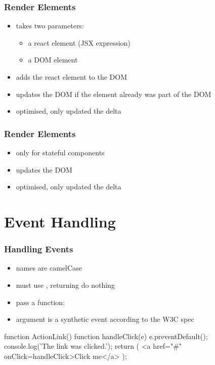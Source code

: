 \begin{frame}[fragile] \frametitle{Render Elements}
\begin{itemize}
  \item takes two parameters:
  \begin{itemize}
    \item a react element (JSX expression)
    \item a DOM element
  \end{itemize}
  \item adds the react element to the DOM
  \item updates the DOM if the element already was part of the DOM
  \item optimised, only updated the delta
\end{itemize}
\end{frame}

\begin{frame}[fragile] \frametitle{Render Elements}
\begin{itemize}
  \item only for stateful components
  \item updates the DOM
  \item optimised, only updated the delta
\end{itemize}
\end{frame}

\section{Event Handling}
\begin{frame}[fragile] \frametitle{Handling Events}
\begin{itemize}
  \item names are camelCase
  \item must use , returning  do nothing
  \item pass a function: 
  \item argument is a synthetic event according to the W3C spec
\end{itemize}
\begin{CodeBox}{}
function ActionLink() {
  function handleClick(e) {
    e.preventDefault();
    console.log('The link was clicked.');
  }
  return (
    <a href="#" onClick={handleClick}>Click me</a>
  );
}
\end{CodeBox}
\end{frame}

